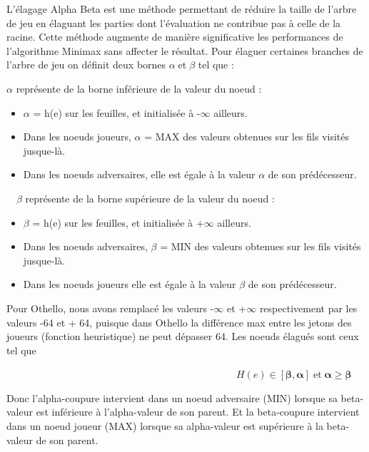 \documentclass[11pt]{article}
\newcommand{\nocomma}{}
\newcommand{\tmmathbf}[1]{\ensuremath{\boldsymbol{#1}}}
\newcommand{\tmop}[1]{\ensuremath{\operatorname{#1}}}
\newenvironment{itemizedot}{\begin{itemize} \renewcommand{\labelitemi}{$\bullet$}\renewcommand{\labelitemii}{$\bullet$}\renewcommand{\labelitemiii}{$\bullet$}\renewcommand{\labelitemiv}{$\bullet$}}{\end{itemize}}
\begin{document}
L'élagage Alpha Beta est une méthode permettant de réduire la
taille de l'arbre de jeu en élaguant les parties dont l'évaluation ne
contribue pas à celle de la racine. Cette méthode augmente de
manière significative les performances de l'algorithme Minimax sans
affecter le résultat. Pour élaguer certaines branches de l'arbre de
jeu on définit deux bornes $\alpha \nocomma \tmop{et} \beta$ tel que :

$\alpha$ représente de la borne inférieure de la valeur du noeud :
\begin{itemizedot}
  \item $\alpha$ = h(e) sur les feuilles, et initialisée à -$\infty$
  ailleurs.
  
  \item Dans les noeuds joueurs, $\alpha$ = MAX des valeurs obtenues sur les
  fils visités jusque-là.
  
  \item Dans les noeuds adversaires, elle est égale à la valeur
  $\alpha$ de son prédécesseur.
\end{itemizedot}
\ \ $\beta$ représente de la borne supérieure de la valeur du noeud :
\begin{itemizedot}
  \item $\beta$ = h(e) sur les feuilles, et initialisée à +$\infty$
  ailleurs.
  
  \item Dans les noeuds adversaires, $\beta$ = MIN des valeurs obtenues sur
  les fils visités jusque-là.
  
  \item Dans les noeuds joueurs elle est égale à la valeur $\beta$ de
  son prédécesseur.
\end{itemizedot}
Pour Othello, nous avons remplacé les valeurs -$\infty$ et +$\infty$
respectivement par les valeurs -64 et + 64, puisque dans Othello la
différence max entre les jetons des joueurs (fonction heuristique) ne peut
dépasser 64. Les noeuds élagués sont ceux tel que

\ \ \ \ \ \ \ \ \ \ \ \ \ \ \ \ \ \ \ \ \ \ \ \ \ \ \ \ \ \ \ \ \ \ \ \ \ \ \
\ \ \ \ \ \ \ $ H ( e) \in [ \tmmathbf{\beta} \nocomma \nocomma,
\tmmathbf{\alpha}] \tmop{et} \tmmathbf{\alpha} \geqslant \tmmathbf{\beta}$

Donc l'alpha-coupure intervient dans un noeud adversaire (MIN) lorsque sa
beta-valeur est inférieure à l'alpha-valeur de son parent. Et la
beta-coupure intervient dans un noeud joueur (MAX) lorsque sa alpha-valeur est supérieure à la beta-valeur de son parent.
\end{document}
